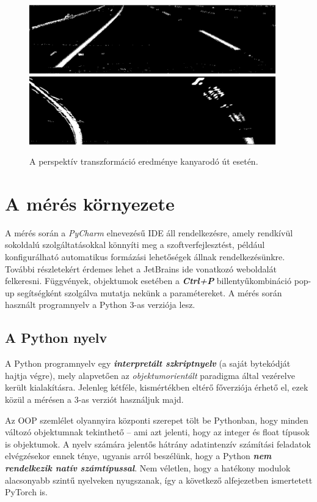 \documentclass[12pt,a4paper,oneside]{report}             %
\begin{document}
\begin{figure}[!htb]
	\centering
	\includegraphics[width=0.95\textwidth]{images/21.png}
	\includegraphics[width=0.95\textwidth]{images/22.png}
	\label{fig:2}
	\caption{A perspektív transzformáció eredménye kanyarodó út esetén.}
\end{figure}

\chapter{A mérés környezete}

A mérés során a \emph{PyCharm} elnevezésű IDE áll rendelkezésre, amely rendkívül sokoldalú szolgáltatásokkal könnyíti meg a szoftverfejlesztést, például konfigurálható automatikus formázási lehetőségek állnak rendelkezésünkre. További részletekért érdemes lehet a JetBrains ide vonatkozó weboldalát~\cite{pycharm} felkeresni. Függvények, objektumok esetében a \textbf{\textit{Ctrl+P}} billentyűkombináció pop-up segítségként szolgálva mutatja nekünk a paramétereket. A mérés során használt programnyelv a Python 3-as verziója lesz.

\section{A Python nyelv}

A Python programnyelv egy \textbf{\textit{interpretált szkriptnyelv}} (a saját bytekódját hajtja végre), mely alapvetően az \emph{objektumorientált} paradigma által vezérelve került kialakításra. Jelenleg kétféle, kismértékben eltérő főverziója érhető el, ezek közül a mérésen a 3-as verziót használjuk majd.

Az OOP szemlélet olyannyira központi szerepet tölt be Pythonban, hogy minden változó objektumnak tekinthető – ami azt jelenti, hogy az integer és float típusok is objektumok. A nyelv számára jelentős hátrány adatintenzív számítási feladatok elvégzésekor ennek ténye, ugyanis arról beszélünk, hogy a Python \textbf{\textit{nem rendelkezik natív számtípussal}}. Nem véletlen, hogy a hatékony modulok alacsonyabb szintű nyelveken nyugszanak, így a következő alfejezetben ismertetett PyTorch is.
\end{document}
